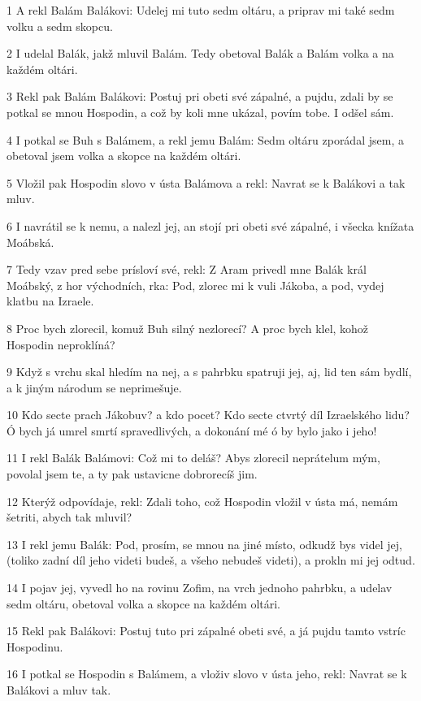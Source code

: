 \par 1 A rekl Balám Balákovi: Udelej mi tuto sedm oltáru, a priprav mi také sedm volku a sedm skopcu.
\par 2 I udelal Balák, jakž mluvil Balám. Tedy obetoval Balák a Balám volka a na každém oltári.
\par 3 Rekl pak Balám Balákovi: Postuj pri obeti své zápalné, a pujdu, zdali by se potkal se mnou Hospodin, a což by koli mne ukázal, povím tobe. I odšel sám.
\par 4 I potkal se Buh s Balámem, a rekl jemu Balám: Sedm oltáru zporádal jsem, a obetoval jsem volka a skopce na každém oltári.
\par 5 Vložil pak Hospodin slovo v ústa Balámova a rekl: Navrat se k Balákovi a tak mluv.
\par 6 I navrátil se k nemu, a nalezl jej, an stojí pri obeti své zápalné, i všecka knížata Moábská.
\par 7 Tedy vzav pred sebe prísloví své, rekl: Z Aram privedl mne Balák král Moábský, z hor východních, rka: Pod, zlorec mi k vuli Jákoba, a pod, vydej klatbu na Izraele.
\par 8 Proc bych zlorecil, komuž Buh silný nezlorecí? A proc bych klel, kohož Hospodin neproklíná?
\par 9 Když s vrchu skal hledím na nej, a s pahrbku spatruji jej, aj, lid ten sám bydlí, a k jiným národum se neprimešuje.
\par 10 Kdo secte prach Jákobuv? a kdo pocet? Kdo secte ctvrtý díl Izraelského lidu? Ó bych já umrel smrtí spravedlivých, a dokonání mé ó by bylo jako i jeho!
\par 11 I rekl Balák Balámovi: Což mi to deláš? Abys zlorecil neprátelum mým, povolal jsem te, a ty pak ustavicne dobrorecíš jim.
\par 12 Kterýž odpovídaje, rekl: Zdali toho, což Hospodin vložil v ústa má, nemám šetriti, abych tak mluvil?
\par 13 I rekl jemu Balák: Pod, prosím, se mnou na jiné místo, odkudž bys videl jej, (toliko zadní díl jeho videti budeš, a všeho nebudeš videti), a prokln mi jej odtud.
\par 14 I pojav jej, vyvedl ho na rovinu Zofim, na vrch jednoho pahrbku, a udelav sedm oltáru, obetoval volka a skopce na každém oltári.
\par 15 Rekl pak Balákovi: Postuj tuto pri zápalné obeti své, a já pujdu tamto vstríc Hospodinu.
\par 16 I potkal se Hospodin s Balámem, a vloživ slovo v ústa jeho, rekl: Navrat se k Balákovi a mluv tak.
